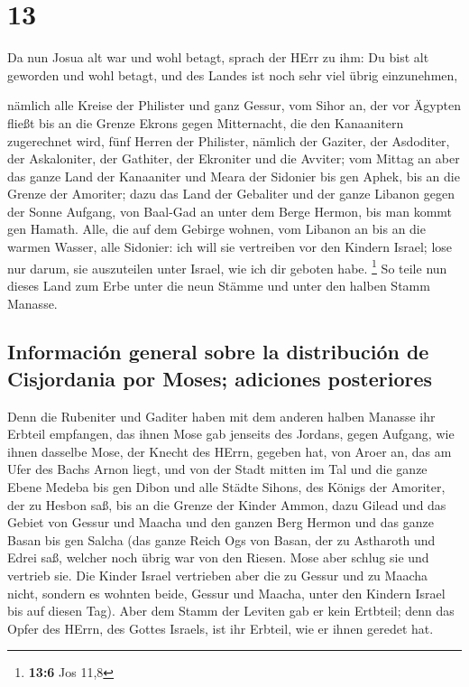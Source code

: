 \hypertarget{section-12}{%
\section{13}\label{section-12}}

 Da nun Josua alt war und wohl betagt, sprach der HErr zu
ihm: Du bist alt geworden und wohl betagt, und des Landes ist noch sehr
viel übrig einzunehmen,

 nämlich alle Kreise der Philister und ganz Gessur,
 vom Sihor an, der vor Ägypten fließt bis an die Grenze
Ekrons gegen Mitternacht, die den Kanaanitern zugerechnet wird, fünf
Herren der Philister, nämlich der Gaziter, der Asdoditer, der
Askaloniter, der Gathiter, der Ekroniter und die Avviter; 
vom Mittag an aber das ganze Land der Kanaaniter und Meara der Sidonier
bis gen Aphek, bis an die Grenze der Amoriter;  dazu das
Land der Gebaliter und der ganze Libanon gegen der Sonne Aufgang, von
Baal-Gad an unter dem Berge Hermon, bis man kommt gen Hamath.
 Alle, die auf dem Gebirge wohnen, vom Libanon an bis an
die warmen Wasser, alle Sidonier: ich will sie vertreiben vor den
Kindern Israel; lose nur darum, sie auszuteilen unter Israel, wie ich
dir geboten habe. \footnote{\textbf{13:6} Jos 11,8}  So
teile nun dieses Land zum Erbe unter die neun Stämme und unter den
halben Stamm Manasse.

\hypertarget{informaciuxf3n-general-sobre-la-distribuciuxf3n-de-cisjordania-por-moses-adiciones-posteriores}{%
\subsection{Información general sobre la distribución de Cisjordania por
Moses; adiciones
posteriores}\label{informaciuxf3n-general-sobre-la-distribuciuxf3n-de-cisjordania-por-moses-adiciones-posteriores}}

 Denn die Rubeniter und Gaditer haben mit dem anderen
halben Manasse ihr Erbteil empfangen, das ihnen Mose gab jenseits des
Jordans, gegen Aufgang, wie ihnen dasselbe Mose, der Knecht des HErrn,
gegeben hat,  von Aroer an, das am Ufer des Bachs Arnon
liegt, und von der Stadt mitten im Tal und die ganze Ebene Medeba bis
gen Dibon  und alle Städte Sihons, des Königs der
Amoriter, der zu Hesbon saß, bis an die Grenze der Kinder Ammon,
 dazu Gilead und das Gebiet von Gessur und Maacha und den
ganzen Berg Hermon und das ganze Basan bis gen Salcha 
(das ganze Reich Ogs von Basan, der zu Astharoth und Edrei saß, welcher
noch übrig war von den Riesen. Mose aber schlug sie und vertrieb sie.
 Die Kinder Israel vertrieben aber die zu Gessur und zu
Maacha nicht, sondern es wohnten beide, Gessur und Maacha, unter den
Kindern Israel bis auf diesen Tag).  Aber dem Stamm der
Leviten gab er kein Ertbteil; denn das Opfer des HErrn, des Gottes
Israels, ist ihr Erbteil, wie er ihnen geredet hat.

